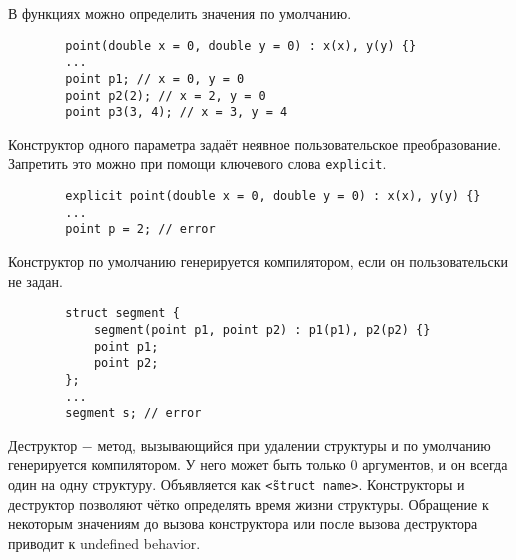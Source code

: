 \documentclass[15pt, a4paper]{article}
\newcommand{\nl}{\newline}
\begin{document}
    В функциях можно определить значения по умолчанию.
    \begin{verbatim}
    	point(double x = 0, double y = 0) : x(x), y(y) {}
        ...
        point p1; // x = 0, y = 0
        point p2(2); // x = 2, y = 0
        point p3(3, 4); // x = 3, y = 4
    \end{verbatim}
    Конструктор одного параметра задаёт неявное пользовательское преобразование. Запретить это можно при
    помощи ключевого слова \texttt{explicit}.
    \begin{verbatim}
    	explicit point(double x = 0, double y = 0) : x(x), y(y) {}
        ...
        point p = 2; // error
    \end{verbatim}
    Конструктор по умолчанию генерируется компилятором, если он пользовательски не задан.
    \begin{verbatim}
    	struct segment {
        	segment(point p1, point p2) : p1(p1), p2(p2) {}
            point p1;
            point p2;
        };
        ...
        segment s; // error
    \end{verbatim}
    Деструктор $-$ метод, вызывающийся при удалении структуры и по умолчанию генерируется компилятором.
    У него может быть только 0 аргументов, и он всегда один на одну структуру. Объявляется как \texttt{\~<struct
    name>}.\nl
    Конструкторы и деструктор позволяют чётко определять время жизни структуры. Обращение к некоторым
    значениям до вызова конструктора или после вызова деструктора приводит к undefined behavior.
    \newpage
\end{document}
